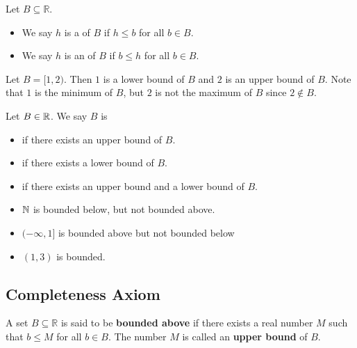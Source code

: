 \documentclass[11pt]{article}
\begin{document}
\begin{definition}
	Let \(B \subseteq \mathbb{R}\).
	\begin{itemize}
		\item We say \(h\) is a  of \(B\) if \(h \leq b\) for all \(b \in
		      B\).
		\item We say \(h\) is an  of \(B\) if \(b \leq h\) for all \(b \in
		      B\).
	\end{itemize}
\end{definition}
\begin{example}
	Let \(B = [1, 2)\). Then \(1\) is a lower bound of \(B\) and \(2\) is an upper bound of \(B\). Note that \(1\) is the minimum of \(B\), but \(2\) is not the maximum of \(B\) since \(2 \notin B\).
\end{example}
\begin{definition}
	Let \(B \in \mathbb R\). We say \(B\) is \begin{itemize}
		\item {} if there exists an upper bound of \(B\).
		\item {} if there exists a lower bound of \(B\).
		\item {} if there exists an upper bound and a lower bound of \(B\).
	\end{itemize}
\end{definition}
\begin{fact}

\end{fact}
\begin{example}
	\begin{itemize}
		\item \(\mathbb N\) is bounded below, but not bounded above.
		\item \((- \infty, 1]\) is bounded above but not bounded below
		\item \((1, 3)\) is bounded.
	\end{itemize}
\end{example}

\subsection{Completeness Axiom}
\begin{definition}
	A set \(B \subseteq \mathbb{R}\) is said to be \textbf{bounded above} if there exists a real number \(M\) such that \(b \leq M\) for all \(b \in B\). The number \(M\) is called an \textbf{upper bound} of \(B\).
\end{definition}
\end{document}
